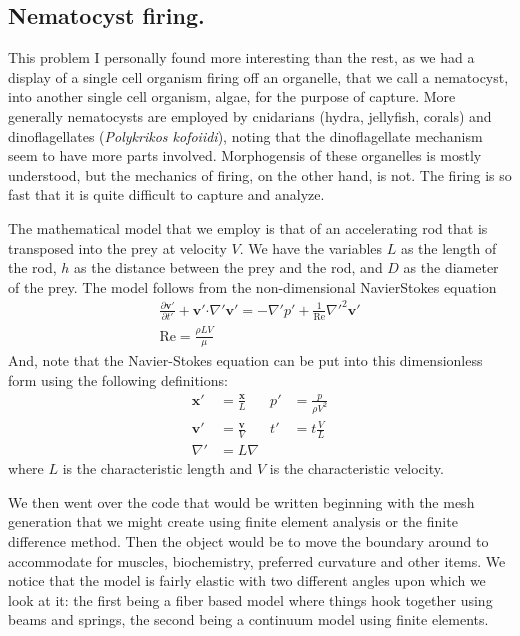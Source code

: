 \documentclass[12pt]{amsart}
\begin{document}
\begin{onehalfspace}
        \section{Nematocyst firing.}
        This problem I personally found more interesting than the rest, as we had a display of a
        single cell organism firing off an organelle, that we call a nematocyst, into another single
        cell organism, algae, for the purpose of capture.
        More generally nematocysts are employed by cnidarians (hydra, jellyfish, corals) and
        dinoflagellates (\emph{Polykrikos kofoiidi}), noting that the dinoflagellate mechanism
        seem to have more parts involved.
        Morphogensis of these organelles is mostly understood, but the mechanics of firing, on the other
        hand, is not.
        The firing is so fast that it is quite difficult to capture and analyze.

        The mathematical model that we employ is that of an accelerating rod that is transposed into
        the prey at velocity $V$. We have the variables $L$ as the length of the rod, $h$ as the distance
        between the prey and the rod, and $D$ as the diameter of the prey. The model follows from
        the non-dimensional NavierStokes equation
        \begin{gather*}
            \frac{\partial\mathbf{v}'}{\partial t'} +\mathbf{v}'\boldsymbol{\cdot}\nabla'\mathbf{v}' = -\nabla'p' + \frac{1}{\text{Re}}\nabla'^2\mathbf{v}'\\
            \text{Re}  = \frac{\rho LV}{\mu}
        \end{gather*}
        And, note that the Navier-Stokes equation can be put into this dimensionless form using the following
        definitions:
        \begin{align*}
            \mathbf{x}' &= \frac{\mathbf{x}}{L} & p' &= \frac{p}{\rho V^2} \\
            \mathbf{v}' &= \frac{\mathbf{v}}{V} & t' &= t\frac{V}{L} \\
            \nabla' &= L\nabla &
        \end{align*}
        where $L$ is the characteristic length and $V$ is the characteristic velocity.

        We then went over the code that would be written beginning with the mesh generation that we
        might create using finite element analysis or the finite difference method.
        Then the object would be to move the boundary around to accommodate for muscles, biochemistry,
        preferred curvature and other items.
        We notice that the model is fairly elastic with two different angles upon which we look at it:
        the first being a fiber based model where things hook together using beams and springs,
        the second being a continuum model using finite elements.


\end{onehalfspace}
\end{document}
